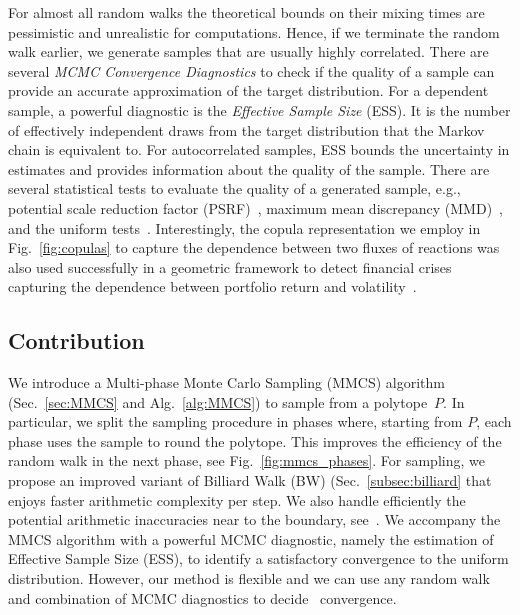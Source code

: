    For almost all random walks the theoretical bounds on their mixing times are
   pessimistic and unrealistic for  computations. Hence,
   if we terminate the random walk earlier, we generate samples that are  usually highly correlated.
   There are several \textit{MCMC Convergence Diagnostics} \cite{Roy20} to check
   if  the quality of a  sample can  provide an accurate
   approximation of the target distribution. For a dependent sample, a powerful
   diagnostic is the \textit {Effective Sample Size} (ESS). It is the number of
   effectively independent draws from the target distribution that the Markov chain
   is equivalent to. For autocorrelated samples, ESS bounds
   the uncertainty in estimates \cite{geyer92} and provides  information about
   the quality of the sample. There are several statistical tests to evaluate the quality of a generated sample, e.g., potential scale reduction factor (PSRF)~\cite{Gelman92}, maximum mean discrepancy (MMD)~\cite{Gretton12},
   and the uniform tests~\cite{CousinsThesis17}.
   Interestingly, 
   the copula representation we employ in Fig.~\ref{fig:copulas} to capture the dependence between two fluxes of reactions was also used  successfully in a geometric framework to detect financial crises capturing the dependence between portfolio return and volatility~\cite{Cales18}.

\subsection{Contribution}
\label{sec:mmcs-contribution}


   We introduce a Multi-phase Monte Carlo Sampling (MMCS) algorithm
   (Sec.~\ref{sec:MMCS} and Alg.~\ref{alg:MMCS}) to sample from a polytope~$P$. In
   particular, we split the sampling procedure in phases where, starting from $P$,
   each phase uses the sample to round the polytope. This improves the efficiency
   of the random walk in the next phase, see Fig.~\ref{fig:mmcs_phases}.
   For sampling, we propose an improved variant of Billiard Walk (BW)
   (Sec.~\ref{subsec:billiard} that enjoys faster
   arithmetic complexity per step. We also handle efficiently the potential arithmetic inaccuracies near to the boundary, see~\cite{ChePioCaz18}.
   We accompany the MMCS algorithm with a powerful MCMC diagnostic, namely the
   estimation of Effective Sample Size (ESS), to identify a satisfactory
   convergence to the uniform distribution.
   However, our method is flexible and  we can
   use any  random walk and
   combination of MCMC diagnostics to decide~
   convergence.

